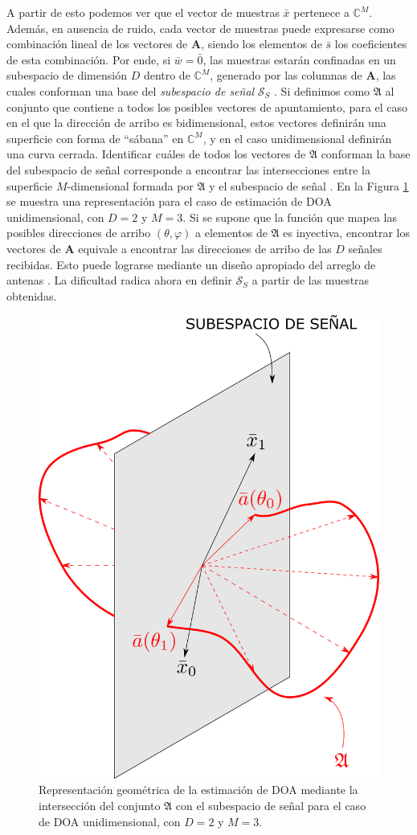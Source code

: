 A partir de esto podemos ver que el vector de muestras $\bar{x}$ pertenece a $\mathbb{C}^M$. Además, en ausencia de ruido, cada vector de muestras puede expresarse como combinación lineal de los vectores de $\mathbf{A}$, siendo los elementos de $\bar{s}$ los coeficientes de esta combinación. Por ende, si $\bar{w}=\bar{0}$, las muestras estarán confinadas en un subespacio de dimensión $D$ dentro de $\mathbb{C}^M$, generado por las columnas de $\mathbf{A}$, las cuales conforman una base del \emph{subespacio de señal} $\mathcal{S}_S$ \cite{bib:esprit_roy}. Si definimos como $\mathfrak{A}$ al conjunto que contiene a todos los posibles vectores de apuntamiento, para el caso en el que la dirección de arribo es bidimensional, estos vectores definirán una superficie con forma de ``sábana'' en $\mathbb{C}^M$, y en el caso unidimensional definirán una curva cerrada. Identificar cuáles de todos los vectores de $\mathfrak{A}$ conforman la base del subespacio de señal corresponde a encontrar las intersecciones entre la superficie $M$-dimensional formada por $\mathfrak{A}$ y el subespacio de señal \cite{bib:music_schmidt}. En la Figura \ref{fig:doaest_arraymanifold} se muestra una representación para el caso de estimación de DOA unidimensional, con $D=2$ y $M=3$. Si se supone que la función que mapea las posibles direcciones de arribo $(\theta,\varphi)$ a elementos de $\mathfrak{A}$ es inyectiva, encontrar los vectores de $\mathbf{A}$ equivale a encontrar las direcciones de arribo de las $D$ señales recibidas. Esto puede lograrse mediante un diseño apropiado del arreglo de antenas \cite{bib:esprit_roy}. La dificultad radica ahora en definir $\mathcal{S}_S$ a partir de las muestras obtenidas.
\begin{figure}[ht!]
    \centering
    \includegraphics[width=0.7\linewidth]{images/03-DOAEst/arraymanifold.png}
    \caption{Representación geométrica de la estimación de DOA mediante la intersección del conjunto $\mathfrak{A}$ con el subespacio de señal para el caso de DOA unidimensional, con $D=2$ y $M=3$.}
    \label{fig:doaest_arraymanifold}
\end{figure}

